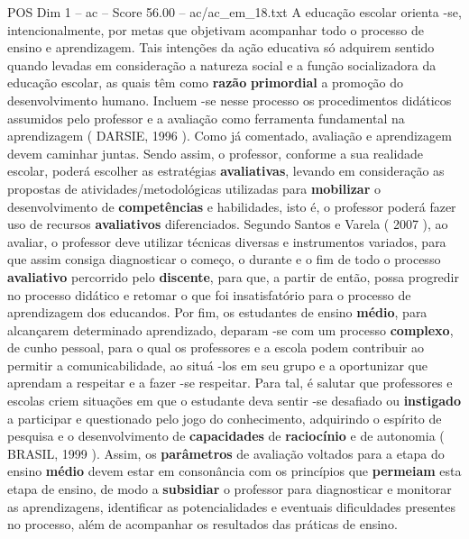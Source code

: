 \begin{textsample}{POS Dim 1 – ac – Score 56.00 – ac/ac\_em\_18.txt}
A educação escolar orienta -se, intencionalmente, por metas que objetivam acompanhar todo o processo de ensino e aprendizagem.
Tais intenções da ação educativa só adquirem sentido quando levadas em consideração a natureza social e a função socializadora da educação escolar, as quais têm como \textbf{razão} \textbf{primordial} a promoção do desenvolvimento humano.
Incluem -se nesse processo os procedimentos didáticos assumidos pelo professor e a avaliação como ferramenta fundamental na aprendizagem ( DARSIE, 1996 ).
Como já comentado, avaliação e aprendizagem devem caminhar juntas.
Sendo assim, o professor, conforme a sua realidade escolar, poderá escolher as estratégias \textbf{avaliativas}, levando em consideração as propostas de atividades/metodológicas utilizadas para \textbf{mobilizar} o desenvolvimento de \textbf{competências} e habilidades, isto é, o professor poderá fazer uso de recursos \textbf{avaliativos} diferenciados.
Segundo Santos e Varela ( 2007 ), ao avaliar, o professor deve utilizar técnicas diversas e instrumentos variados, para que assim consiga diagnosticar o começo, o durante e o fim de todo o processo \textbf{avaliativo} percorrido pelo \textbf{discente}, para que, a partir de então, possa progredir no processo didático e retomar o que foi insatisfatório para o processo de aprendizagem dos educandos.
Por fim, os estudantes de ensino \textbf{médio}, para alcançarem determinado aprendizado, deparam -se com um processo \textbf{complexo}, de cunho pessoal, para o qual os professores e a escola podem contribuir ao permitir a comunicabilidade, ao situá -los em seu grupo e a oportunizar que aprendam a respeitar e a fazer -se respeitar.
Para tal, é salutar que professores e escolas criem situações em que o estudante deva sentir -se desafiado ou \textbf{instigado} a participar e questionado pelo jogo do conhecimento, adquirindo o espírito de pesquisa e o desenvolvimento de \textbf{capacidades} de \textbf{raciocínio} e de autonomia ( BRASIL, 1999 ).
Assim, os \textbf{parâmetros} de avaliação voltados para a etapa do ensino \textbf{médio} devem estar em consonância com os princípios que \textbf{permeiam} esta etapa de ensino, de modo a \textbf{subsidiar} o professor para diagnosticar e monitorar as aprendizagens, identificar as potencialidades e eventuais dificuldades presentes no processo, além de acompanhar os resultados das práticas de ensino.

\end{textsample}
